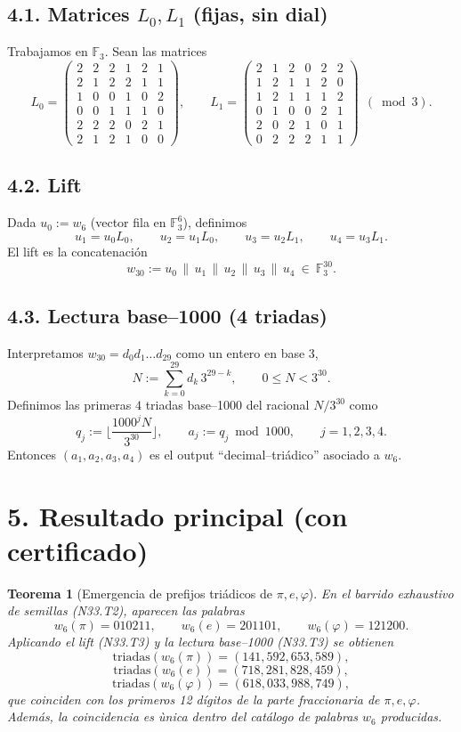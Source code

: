 \documentclass[11pt,a4paper]{article}
\theoremstyle{plain}
\newtheorem{teo}{Teorema}
\theoremstyle{definition}
\theoremstyle{remark}
\begin{document}
\subsection*{4.1. Matrices $L_0,L_1$ (fijas, sin dial)}
Trabajamos en $\mathbb F_3$. Sean las matrices
\[
L_0=
\begin{pmatrix}
2&2&2&1&2&1\\
2&1&2&2&1&1\\
1&0&0&1&0&2\\
0&0&1&1&1&0\\
2&2&2&0&2&1\\
2&1&2&1&0&0
\end{pmatrix},\qquad
L_1=
\begin{pmatrix}
2&1&2&0&2&2\\
1&2&1&1&2&0\\
1&2&1&1&1&2\\
0&1&0&0&2&1\\
2&0&2&1&0&1\\
0&2&2&2&1&1
\end{pmatrix}
\ \ (\bmod 3).
\]

\subsection*{4.2. Lift}
Dada $u_0:=w_6$ (vector fila en $\mathbb F_3^6$), definimos
\[
 u_1=u_0L_0,\qquad u_2=u_1L_0,\qquad u_3=u_2L_1,\qquad u_4=u_3L_1.
\]
El lift es la concatenaci\'on
\[
 w_{30}:=u_0\,\|\,u_1\,\|\,u_2\,\|\,u_3\,\|\,u_4\ \in\ \mathbb F_3^{30}.
\]

\subsection*{4.3. Lectura base--1000 (4 triadas)}
Interpretamos $w_{30}=d_0d_1\dots d_{29}$ como un entero en base 3,
\[
N:=\sum_{k=0}^{29} d_k\,3^{29-k},\qquad 0\le N<3^{30}.
\]
Definimos las primeras $4$ triadas base--1000 del racional $N/3^{30}$ como
\[
 q_j:=\Big\lfloor\frac{1000^j N}{3^{30}}\Big\rfloor,\qquad
 a_j:=q_j\bmod 1000,\qquad j=1,2,3,4.
\]
Entonces $(a_1,a_2,a_3,a_4)$ es el output ``decimal--tri\'adico'' asociado a $w_6$.

\section*{5. Resultado principal (con certificado)}

\begin{teo}[Emergencia de prefijos tri\'adicos de $\pi,e,\varphi$]
En el barrido exhaustivo de semillas (N33.T2), aparecen las palabras
\[
 w_6(\pi)=010211,\qquad w_6(e)=201101,\qquad w_6(\varphi)=121200.
\]
Aplicando el lift (N33.T3) y la lectura base--1000 (N33.T3) se obtienen
\[
\mathrm{triadas}(w_6(\pi))=(141,592,653,589),
\]
\[
\mathrm{triadas}(w_6(e))=(718,281,828,459),
\]
\[
\mathrm{triadas}(w_6(\varphi))=(618,033,988,749),
\]
que coinciden con los primeros 12 d\'igitos de la parte fraccionaria de $\pi,e,\varphi$.
Adem\'as, la coincidencia es \emph{\`unica} dentro del cat\'alogo de palabras $w_6$ producidas.
\end{teo}
\end{document}
